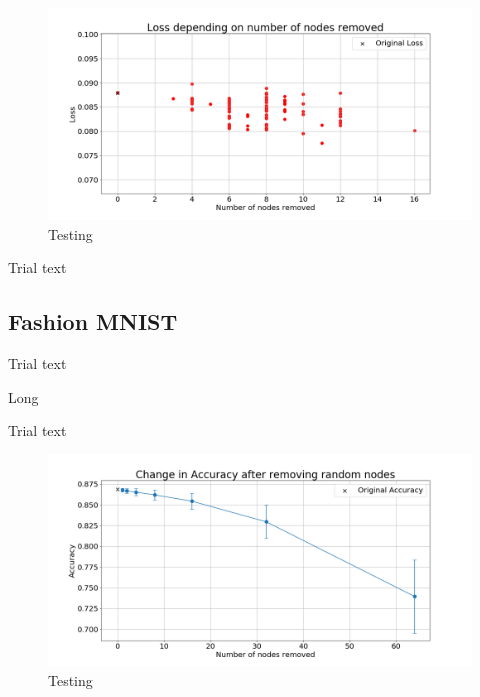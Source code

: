 \documentclass[UKenglish]{ifimaster}
\begin{document}
            \begin{figure}[h!]\centering
                \includegraphics[width=\textwidth]{Loss_vs_nodes_removed_mnist.png}
                \caption[Short title]{Testing}
                \label{fig:loss_rn_imp_mnist}
            \end{figure}

            Trial text

        \subsection{Fashion MNIST}

            Trial text

            \begin{table}[h!]
                \centering
                \resizebox{\textwidth}{!}{}
                \caption[Short]{Long}
                \label{tab:ac_rnd_rem_fmnist}
            \end{table}

            Trial text

            \begin{figure}[h!]\centering
                \includegraphics[width=\textwidth]{Accuracy_change_random_removal_fmnist.png}
                \caption[Short title]{Testing}
                \label{fig:acc_rn_fmnist}
            \end{figure}
\end{document}
